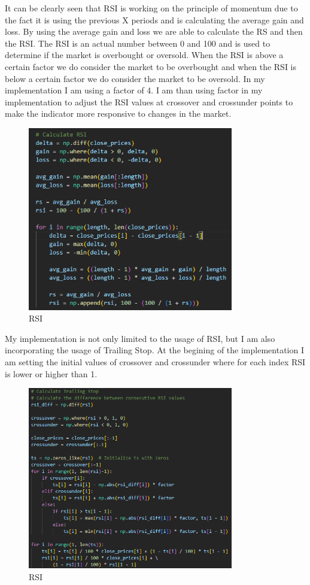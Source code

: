\documentclass{imc-inf}
\begin{document}
	
	It can be clearly seen that RSI \cite{rsi_implement}is working on the principle of momentum due to the fact it is using the previous X periods and is calculating the average gain and loss.
	By using the average gain and loss we are able to calculate the RS and then the RSI. The RSI is an actual number between 0 and 100 and is used to determine if the market is overbought or oversold.
	When the RSI is above a certain factor we do consider the market to be overbought and when the RSI is below a certain factor we do consider the market to be oversold.
	In my implementation I am using a factor of 4. I am than using factor in my implementation to adjust the RSI values at crossover and crossunder points to make the indicator
	more responsive to changes in the market.
	\begin {figure}[h!]
	\centering
	\includegraphics[width=0.8\textwidth]{rsi_code.png}
	\caption{RSI}
	\label{fig:rsi}
	\end {figure}
	My implementation is not only limited to the usage of RSI, but I am also incorporating the usage of Trailing Stop.
	At the begining of the implementation I am setting the initial values of crossover and crossunder where for each index RSI is lower or higher than 1.
	\begin{figure}[h!]
		\centering
		\includegraphics[width=0.8\textwidth]{trailing_stop.png}
		\caption{RSI}
		\label{fig:rsi_initial_values}
	\end{figure}
\end{document}
